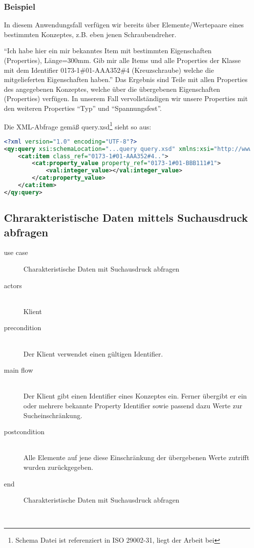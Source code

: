 \subsubsection{Beispiel}

In diesem Anwendungsfall verfügen wir bereits über Elemente/Wertepaare eines bestimmten Konzeptes, z.B. eben jenen Schraubendreher.

\enquote{Ich habe hier ein mir bekanntes Item mit bestimmten Eigenschaften (Properties), Länge=300mm. Gib mir alle Items und alle Properties der Klasse mit dem Identifier 0173-1\#01-AAA352\#4 (Kreuzschraube) welche die mitgelieferten Eigenschaften haben.}
Das Ergebnis sind Teile mit allen Properties des angegebenen Konzeptes, welche über die übergebenen Eigenschaften (Properties) verfügen. In unserem Fall vervollständigen wir unsere Properties mit den weiteren Properties \enquote{Typ} und \enquote{Spannungsfest}.

Die XML-Abfrage gemäß query.xsd\footnote{Schema Datei ist referenziert in ISO 29002-31, liegt der Arbeit bei} sieht so aus:

\begin{lstlisting}[caption=Query Beispiel - Daten validieren, language=XML, label=UseCaseDatenvalidieren]
<?xml version="1.0" encoding="UTF-8"?>
<qy:query xsi:schemaLocation="...query query.xsd" xmlns:xsi="http://www.w3.org/2001/XMLSchema-instance" xmlns:cat="...catalogue" xmlns:val="...value" xmlns:qy="...query" xmlns:bas="...basic">
	<cat:item class_ref="0173-1#01-AAA352#4..">
		<cat:property_value property_ref="0173-1#01-BBB111#1">
			<val:integer_value></val:integer_value>
		</cat:property_value>
	</cat:item>
</qy:query>
\end{lstlisting}

\subsection{Chrarakteristische Daten mittels Suchausdruck abfragen }

{\small

\begin{description}
     \item[use case] Charakteristische Daten mit Suchausdruck abfragen
     \item[  actors]~\\
     Klient
     \item[  precondition]~\\
     Der Klient verwendet einen gültigen Identifier.
     \item[  main flow]~\\
     Der Klient gibt einen Identifier eines Konzeptes ein. Ferner übergibt er ein oder mehrere bekannte Property Identifier sowie passend dazu Werte zur Sucheinschränkung. 
     \item[  postcondition]~\\
     Alle Elemente auf jene diese Einschränkung der übergebenen Werte zutrifft wurden zurückgegeben. 
     \item[end] Charakteristische Daten mit Suchausdruck abfragen
\end{description}

~\\

} %

